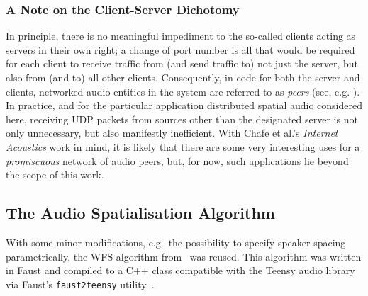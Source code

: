 \subsubsection{A Note on the Client-Server Dichotomy}\label{subsubsec:client-server}

In principle, there is no meaningful impediment to the so-called
clients acting as servers in their own right; a change of port number is all
that would be required for each client to receive traffic from (and send
traffic to) not just the server, but also from (and to) all other clients.
Consequently, in code for both the server and clients, networked audio entities
in the system are referred to as \textit{peers} (see, e.g.
).
In practice, and for the particular application
\textemdash{} distributed spatial audio \textemdash{}
considered here, receiving UDP packets from sources other than the designated
server is not only unnecessary, but also manifestly inefficient.
With Chafe et al.'s \textit{Internet Acoustics} work in mind, it is likely that
there are some very interesting uses for a \textit{promiscuous} network
of audio peers, but, for now, such applications lie beyond the scope of this
work.


\subsection{The Audio Spatialisation Algorithm}\label{subsec:wfs-algorithm}

With some minor modifications, e.g.\ the possibility to specify speaker spacing
parametrically, the WFS algorithm
from~\citep{rushton_microcontroller-based_2023} was reused.
This algorithm was written in Faust and compiled to
a C++ class compatible with the Teensy audio library via Faust's
\texttt{faust2teensy} utility~\citep{michon_real_2019}.


